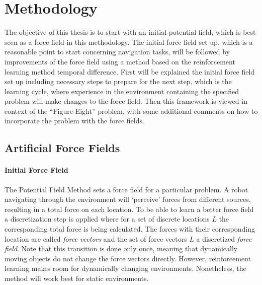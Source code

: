 \documentclass[11pt]{article}
\begin{document}



\section{Methodology}
\label{sec:method}


The objective of this thesis is to start with an initial potential field, which is best seen as a force field in this methodology. The initial force field set up, which is a reasonable point to start concerning navigation tasks, will be followed by improvements of the force field using a method based on the reinforcement learning method temporal difference. First will be explained the initial force field set up including necessary steps to prepare for the next step, which is the learning cycle, where experience in the environment containing the specified problem will make changes to the force field. Then this framework is viewed in context of the ``Figure-Eight'' problem, with some additional comments on how to incorporate the problem with the force fields.

\subsection{Artificial Force Fields}
\paragraph{Initial Force Field}
The Potential Field Method sets a force field for a particular problem. A robot navigating through the environment will `perceive' forces from different sources, resulting in a total force on each location. To be able to learn a better force field a discretization step is applied where for a set of discrete locations $L$ the corresponding total force is being calculated. The forces with their corresponding location are called \emph{force vectors} and the set of force vectors $L$ a discretized \emph{force field}. Note that this transition is done only once, meaning that dynamically moving objects do not change the force vectors directly. However, reinforcement learning makes room for dynamically changing environments. Nonetheless, the method will work best for static environments.
\end{document}
